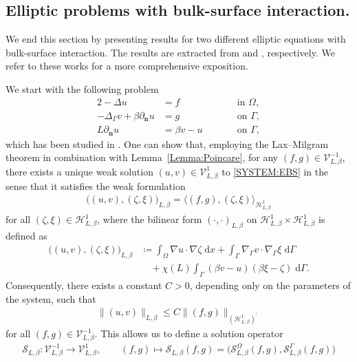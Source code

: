 \documentclass[10pt,reqno]{amsart}
\theoremstyle{remark}
\numberwithin{equation}{section}
\newcommand{\norm}[1]{\| #1 \|}
\newcommand{\n}{\mathbf{n}}
\newcommand{\intO}{\int_\Omega}
\newcommand{\intG}{\int_\Gamma}
\newcommand{\dx}{\;\mathrm{d}x}
\newcommand{\dG}{\;\mathrm d\Ga}
\newcommand{\deln}{\partial_\n}
\newcommand{\Grad}{\nabla}
\newcommand{\Lap}{\Delta}
\newcommand{\Gradg}{\nabla_\Ga}
\newcommand{\Lapg}{\Delta_\Ga}
\newcommand{\Om}{\Omega}
\newcommand{\Ga}{\Gamma}
\begin{document}
\medskip
\subsection{Elliptic problems with bulk-surface interaction.}
We end this section by presenting results for two different elliptic equations with bulk-surface interaction. The results are extracted from \cite{Knopf2021} and \cite{Stange2025}, respectively. We refer to these works for a more comprehensive exposition.

We start with the following problem
\begin{alignat}{2}\label{SYSTEM:EBS}
    -\Lap u &= f &&\qquad\text{in~}\Om, \nonumber \\
    -\Lapg v + \beta\deln u &= g &&\qquad\text{on~}\Ga, \\
    L\deln u &= \beta v - u &&\qquad\text{on~}\Ga, \nonumber
\end{alignat}
which has been studied in \cite{Knopf2021}. One can show that, employing the Lax--Milgram theorem in combination with Lemma~\ref{Lemma:Poincare}, for any $(f,g)\in\mathcal{V}_{L,\beta}^{-1}$, there exists a unique weak solution $(u,v)\in\mathcal{V}^1_{L,\beta}$ to \eqref{SYSTEM:EBS} in the sense that it satisfies the weak formulation
\begin{align*}
    \big((u,v),(\zeta,\xi))_{L,\beta} = \big\langle (f,g), (\zeta,\xi) \big\rangle_{\mathcal{H}^1_{L,\beta}}
\end{align*}
for all $(\zeta,\xi)\in\mathcal{H}^1_{L,\beta}$, where the bilinear form $(\cdot,\cdot)_{L,\beta}$ on $\mathcal{H}^1_{L,\beta}\times\mathcal{H}^1_{L,\beta}$ is defined as
\begin{align*}
    \big((u,v),(\zeta,\xi)\big)_{L,\beta} &\coloneqq \intO \Grad u\cdot\Grad\zeta\dx + \intG \Gradg v\cdot\Gradg\xi\dG \\
    &\quad + \chi(L)\intG (\beta v - u)(\beta\xi - \zeta)\dG.
\end{align*}
Consequently, there exists a constant $C > 0$, depending only on the parameters of the system, such that
\begin{align*}
    \norm{(u,v)}_{L,\beta} \leq C\norm{(f,g)}_{(\mathcal{H}^1_{L,\beta})^\prime}
\end{align*}
for all $(f,g)\in\mathcal{V}_{L,\beta}^{-1}$. This allows us to define a solution operator
\begin{align*}
    \mathcal{S}_{L,\beta}:\mathcal{V}_{L,\beta}^{-1}\rightarrow \mathcal{V}_{L,\beta}^1, \qquad (f,g)\mapsto \mathcal{S}_{L,\beta}(f,g) = \big(\mathcal{S}_{L,\beta}^\Om(f,g),\mathcal{S}_{L,\beta}^\Ga(f,g)\big)
\end{align*}
\end{document}
